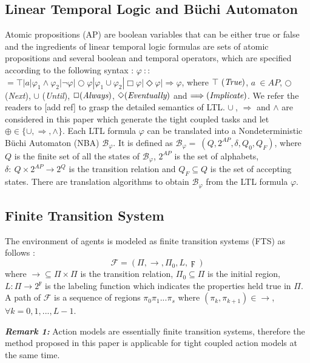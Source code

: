 \documentclass[journal]{IEEEtran}
\begin{document}
\subsection{Linear Temporal Logic and B\"{u}chi Automaton}
Atomic propositions (AP) are boolean variables that can be either true or false and the
ingredients of linear temporal logic formulas are sets of atomic propositions and several
boolean and temporal operators, which are specified according to the following syntax
\cite{baier2008principles}: $\varphi\ $$:$$:$$=\top|a|\varphi_1\wedge\varphi_2| \neg \varphi|\bigcirc\varphi|\varphi_1\cup\varphi_2|\Box\varphi|\Diamond\varphi|\Longrightarrow\varphi$, where $\top\ (\emph{True})$, $a\ \in AP$, $\bigcirc$ (\emph{Next}), $\cup$ (\emph{Until}), $\Box (\emph{Always})$,  $\Diamond (\emph{Eventually})$ and $\Longrightarrow (\emph{Implicate})$. We refer the readers to [add ref] to grasp the detailed semantics of LTL. $\cup\ $, $\Longrightarrow$ and $\wedge$ are considered in this paper which generate the tight coupled tasks and let $\oplus \in \{\cup, \Longrightarrow,\wedge\}$.
Each LTL formula $\varphi$ can be translated into a Nondeterministic B\"{u}chi Automaton (NBA) $\mathcal{B}_\varphi$. It is defined as $\mathcal{B}_\varphi=\ (Q,2^{AP},\delta,Q_0,Q_F)$, where $Q$ is the finite set of all the states of $\mathcal{B}_\varphi$, $2^{AP}$ is the set of alphabets, $\delta:\ Q\times 2^{AP}\rightarrow 2^Q$ is the transition relation and $Q_F \subseteq Q$ is the set of accepting states. There are translation algorithms \cite{GASTIN2001Fast} to obtain $\mathcal{B}_\varphi$ from the LTL formula $\varphi$.
\subsection{Finite Transition System}
The environment of agents is modeled as finite transition systems (FTS) as follows \cite{baier2008principles}:
$$\mathcal{F}=(\Pi,\rightarrow,\Pi_0,L,\digamma)$$
where $\rightarrow \subseteq \Pi \times \Pi$ is the transition relation, $\Pi_0 \subseteq \Pi$ is the initial region, $L:\Pi\rightarrow 2^{\digamma}$ is the labeling function which indicates the properties held true in $\Pi$. A path of $\mathcal{F}$ is a sequence of regions $\pi_0 \pi_1 ...\pi_s$ where $(\pi_k,\pi_{k+1})\in \rightarrow$, $\forall k=0,1,...,L-1$.

\textbf{\emph{Remark 1:}} Action models are essentially finite transition systems, therefore the method proposed in this paper is applicable for tight coupled action models at the same time.
\end{document}

